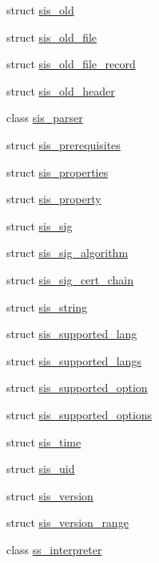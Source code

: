 \begin{DoxyCompactItemize}
\item 
struct \mbox{\hyperlink{structeka2l1_1_1loader_1_1sis__old}{sis\+\_\+old}}
\item 
struct \mbox{\hyperlink{structeka2l1_1_1loader_1_1sis__old__file}{sis\+\_\+old\+\_\+file}}
\item 
struct \mbox{\hyperlink{structeka2l1_1_1loader_1_1sis__old__file__record}{sis\+\_\+old\+\_\+file\+\_\+record}}
\item 
struct \mbox{\hyperlink{structeka2l1_1_1loader_1_1sis__old__header}{sis\+\_\+old\+\_\+header}}
\item 
class \mbox{\hyperlink{classeka2l1_1_1loader_1_1sis__parser}{sis\+\_\+parser}}
\item 
struct \mbox{\hyperlink{structeka2l1_1_1loader_1_1sis__prerequisites}{sis\+\_\+prerequisites}}
\item 
struct \mbox{\hyperlink{structeka2l1_1_1loader_1_1sis__properties}{sis\+\_\+properties}}
\item 
struct \mbox{\hyperlink{structeka2l1_1_1loader_1_1sis__property}{sis\+\_\+property}}
\item 
struct \mbox{\hyperlink{structeka2l1_1_1loader_1_1sis__sig}{sis\+\_\+sig}}
\item 
struct \mbox{\hyperlink{structeka2l1_1_1loader_1_1sis__sig__algorithm}{sis\+\_\+sig\+\_\+algorithm}}
\item 
struct \mbox{\hyperlink{structeka2l1_1_1loader_1_1sis__sig__cert__chain}{sis\+\_\+sig\+\_\+cert\+\_\+chain}}
\item 
struct \mbox{\hyperlink{structeka2l1_1_1loader_1_1sis__string}{sis\+\_\+string}}
\item 
struct \mbox{\hyperlink{structeka2l1_1_1loader_1_1sis__supported__lang}{sis\+\_\+supported\+\_\+lang}}
\item 
struct \mbox{\hyperlink{structeka2l1_1_1loader_1_1sis__supported__langs}{sis\+\_\+supported\+\_\+langs}}
\item 
struct \mbox{\hyperlink{structeka2l1_1_1loader_1_1sis__supported__option}{sis\+\_\+supported\+\_\+option}}
\item 
struct \mbox{\hyperlink{structeka2l1_1_1loader_1_1sis__supported__options}{sis\+\_\+supported\+\_\+options}}
\item 
struct \mbox{\hyperlink{structeka2l1_1_1loader_1_1sis__time}{sis\+\_\+time}}
\item 
struct \mbox{\hyperlink{structeka2l1_1_1loader_1_1sis__uid}{sis\+\_\+uid}}
\item 
struct \mbox{\hyperlink{structeka2l1_1_1loader_1_1sis__version}{sis\+\_\+version}}
\item 
struct \mbox{\hyperlink{structeka2l1_1_1loader_1_1sis__version__range}{sis\+\_\+version\+\_\+range}}
\item 
class \mbox{\hyperlink{classeka2l1_1_1loader_1_1ss__interpreter}{ss\+\_\+interpreter}}
\end{DoxyCompactItemize}
